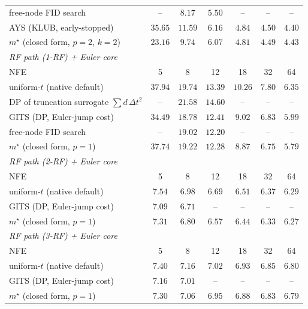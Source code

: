 \documentclass[11pt]{article}
\begin{document}
\begin{table}[p]
\begin{tabular}{lcccccc}
\quad free-node FID search & -- & $\mathbf{8.17}$ & $\mathbf{5.50}$ & -- & -- & --\\
\quad AYS (KLUB, early-stopped) & $35.65$ & $11.59$ & $6.16$ & $\mathbf{4.84}$ & $\mathbf{4.50}$ & $\mathbf{4.40}$\\
\quad $m^\star$ (closed form, $p\!=\!2$, $k\!=\!2$) & $\mathbf{23.16}$ & $9.74$ & $6.07$ & $\mathbf{4.81}$ & $\mathbf{4.49}$ & $\mathbf{4.43}$\\
\midrule
\multicolumn{7}{l}{\emph{RF path (1-RF) + Euler core}}\\[1pt]
\quad NFE & 5 & 8 & 12 & 18 & 32 & 64\\
\quad uniform-$t$ (native default) & $37.94$ & $19.74$ & $13.39$ & $10.26$ & $7.80$ & $6.35$\\
\quad DP of truncation surrogate $\sum d\,\Delta t^{2}$ & -- & $21.58$ & $14.60$ & -- & -- & --\\
\quad GITS (DP, Euler-jump cost) & $\mathbf{34.49}$ & $\mathbf{18.78}$ & $\mathbf{12.41}$ & $\mathbf{9.02}$ & $\mathbf{6.83}$ & $5.99$\\
\quad free-node FID search & -- & $\mathbf{19.02}$ & $\mathbf{12.20}$ & -- & -- & --\\
\quad $m^\star$ (closed form, $p\!=\!1$) & $37.74$ & $19.22$ & $\mathbf{12.28}$ & $\mathbf{8.87}$ & $\mathbf{6.75}$ & $\mathbf{5.79}$\\
\midrule
\multicolumn{7}{l}{\emph{RF path (2-RF) + Euler core}}\\[1pt]
\quad NFE & 5 & 8 & 12 & 18 & 32 & 64\\
\quad uniform-$t$ (native default) & $7.54$ & $6.98$ & $6.69$ & $\mathbf{6.51}$ & $\mathbf{6.37}$ & $\mathbf{6.29}$\\
\quad GITS (DP, Euler-jump cost) & $\mathbf{7.09}$ & $\mathbf{6.71}$ & -- & -- & -- & --\\
\quad $m^\star$ (closed form, $p\!=\!1$) & $7.31$ & $6.80$ & $\mathbf{6.57}$ & $\mathbf{6.44}$ & $\mathbf{6.33}$ & $\mathbf{6.27}$\\
\midrule
\multicolumn{7}{l}{\emph{RF path (3-RF) + Euler core}}\\[1pt]
\quad NFE & 5 & 8 & 12 & 18 & 32 & 64\\
\quad uniform-$t$ (native default) & $7.40$ & $7.16$ & $\mathbf{7.02}$ & $\mathbf{6.93}$ & $\mathbf{6.85}$ & $\mathbf{6.80}$\\
\quad GITS (DP, Euler-jump cost) & $\mathbf{7.16}$ & $\mathbf{7.01}$ & -- & -- & -- & --\\
\quad $m^\star$ (closed form, $p\!=\!1$) & $7.30$ & $\mathbf{7.06}$ & $\mathbf{6.95}$ & $\mathbf{6.88}$ & $\mathbf{6.83}$ & $\mathbf{6.79}$\\

\end{tabular}
\end{table}
\end{document}
